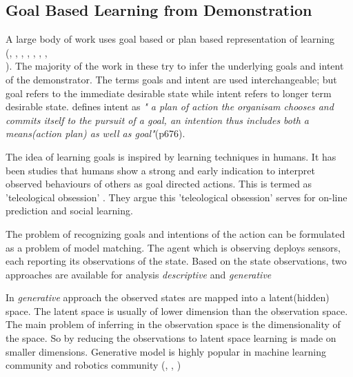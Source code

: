 \subsection{Goal Based Learning from Demonstration}
A large body of work uses
goal based or plan based representation of learning\\
(\cite{friedrich_robot_1995},
\cite{nicolescu_natural_2003}, \cite{csibra_obsessed_2007}, \cite{demiris_prediction_2007},
\cite{veeraraghavan_teaching_2008}, \cite{lee_effective_2009}, \cite{hommel_action_2009}, \\ 
\cite{abdo_learning_2013}). 
The majority of the work in these try to infer the underlying goals and intent of
the demonstrator. The terms goals and intent are used interchangeable; but
goal refers to the immediate desirable state while intent refers to longer term
desirable state. \cite{tomasello_understanding_2005} defines intent as \textit{" a plan of
    action the organisam chooses and commits itself to the pursuit of a goal,
an intention thus includes both a means(action plan) as well as goal"}(p676).

The idea of learning goals is inspired by learning techniques in humans. It has
been studies that humans show a strong and early indication to interpret
observed behaviours of others as goal directed actions. This is termed as
'teleological obsession' \cite{ csibra_obsessed_2007} . They argue this
'teleological obsession' serves for on-line prediction and social learning.

The problem of recognizing goals and intentions of the action can be formulated
as a problem of model matching. The agent which is observing deploys sensors,
each reporting its observations of the state. Based on the state observations, two
approaches are available for analysis \textit{descriptive} and \textit{generative}
\cite { demiris_prediction_2007}

In \textit{generative} approach the observed states are mapped into a latent(hidden)
space. The latent space is usually of lower dimension than the observation
space. The main problem of inferring in the observation space is the
dimensionality of the space. So by reducing the observations to latent space
learning is made on smaller dimensions. Generative model is highly popular in
machine learning community and robotics community (\cite{buxton_learning_2003}, \cite{bishop_pattern_2006}
, \cite{calinon_robot_2009})

